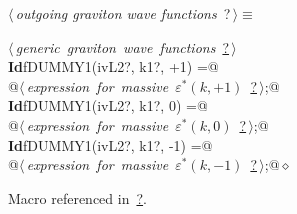 \documentclass[a4paper,12pt]{amsart}
\renewcommand{\NWtarget}[2]{\hypertarget{#1}{#2}}
\renewcommand{\NWlink}[2]{\hyperlink{#1}{#2}}
\renewcommand{\NWtxtMacroRefIn}{Macro referenced in}
\renewcommand{\NWsep}{${\diamond}$}
\begin{document}
\begin{flushleft} \small
\begin{minipage}{\linewidth}\label{scrap42}\raggedright\small
\NWtarget{nuweb?}{} $\langle\,${\it outgoing graviton wave functions}\nobreak\ {\footnotesize {?}}$\,\rangle\equiv$
\vspace{-1ex}
\begin{list}{}{} \item
\mbox{}\verb@@\hbox{$\langle\,${\it generic graviton wave functions}\nobreak\ {\footnotesize \NWlink{nuweb?}{?}}$\,\rangle$}\verb@@\\
\mbox{}\verb@@\hbox{\sffamily\bfseries Id}\verb@ fDUMMY1(ivL2?, k1?, +1) =@\\
\mbox{}\verb@   @\hbox{$\langle\,${\it expression for massive $\varepsilon^\ast(k, +1)$}\nobreak\ {\footnotesize \NWlink{nuweb?}{?}}$\,\rangle$}\verb@;@\\
\mbox{}\verb@@\hbox{\sffamily\bfseries Id}\verb@ fDUMMY1(ivL2?, k1?, 0) =@\\
\mbox{}\verb@   @\hbox{$\langle\,${\it expression for massive $\varepsilon^\ast(k, 0)$}\nobreak\ {\footnotesize \NWlink{nuweb?}{?}}$\,\rangle$}\verb@;@\\
\mbox{}\verb@@\hbox{\sffamily\bfseries Id}\verb@ fDUMMY1(ivL2?, k1?, -1) =@\\
\mbox{}\verb@   @\hbox{$\langle\,${\it expression for massive $\varepsilon^\ast(k, -1)$}\nobreak\ {\footnotesize \NWlink{nuweb?}{?}}$\,\rangle$}\verb@;@{\NWsep}
\end{list}
\vspace{-1.5ex}
\footnotesize
\begin{list}{}{\setlength{\itemsep}{-\parsep}\setlength{\itemindent}{-\leftmargin}}
\item \NWtxtMacroRefIn\ \NWlink{nuweb?}{?}.

\item{}
\end{list}
\end{minipage}\vspace{4ex}
\end{flushleft}
\end{document}
